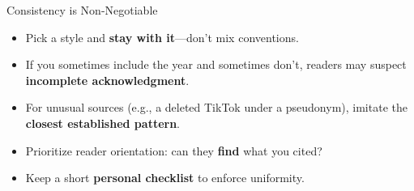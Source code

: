 \documentclass[aspectratio=169]{beamer}
\begin{document}

\begin{frame}{Consistency is Non-Negotiable}
\begin{itemize}
  \item Pick a style and \textbf{stay with it}—don’t mix conventions.
  \item If you sometimes include the year and sometimes don’t, readers may suspect \textbf{incomplete acknowledgment}.
  \item For unusual sources (e.g., a deleted TikTok under a pseudonym), imitate the \textbf{closest established pattern}.
  \item Prioritize reader orientation: can they \textbf{find} what you cited?
  \item Keep a short \textbf{personal checklist} to enforce uniformity.
\end{itemize}
\end{frame}

\end{document}
